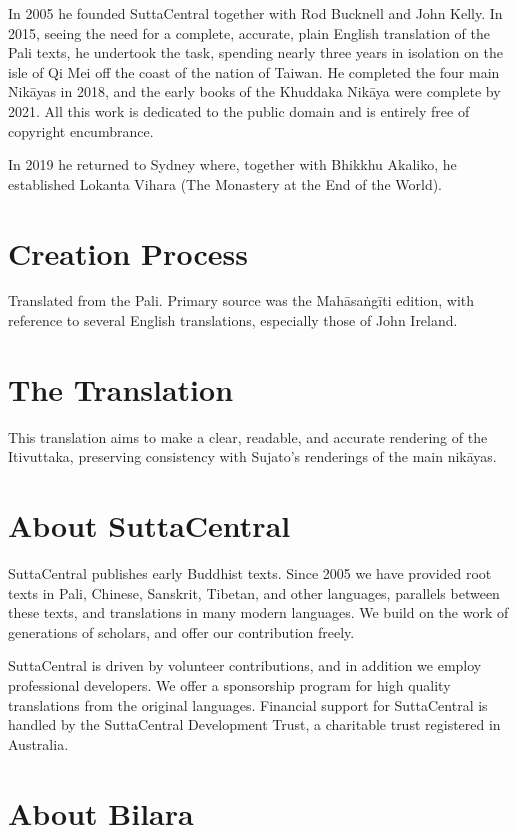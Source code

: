\documentclass[12pt,openany]{book}%
\begin{document}
In 2005 he founded SuttaCentral together with Rod Bucknell and John Kelly. In 2015, seeing the need for a complete, accurate, plain English translation of the Pali texts, he undertook the task, spending nearly three years in isolation on the isle of Qi Mei off the coast of the nation of Taiwan. He completed the four main \textsanskrit{Nikāyas} in 2018, and the early books of the Khuddaka \textsanskrit{Nikāya} were complete by 2021. All this work is dedicated to the public domain and is entirely free of copyright encumbrance. 

In 2019 he returned to Sydney where, together with Bhikkhu Akaliko, he established Lokanta Vihara (The Monastery at the End of the World). 

\section*{Creation Process}

Translated from the Pali. Primary source was the \textsanskrit{Mahāsaṅgīti} edition, with reference to several English translations, especially those of John Ireland.

\section*{The Translation}

This translation aims to make a clear, readable, and accurate rendering of the Itivuttaka, preserving consistency with Sujato’s renderings of the main \textsanskrit{nikāyas}. 

\section*{About SuttaCentral}

SuttaCentral publishes early Buddhist texts. Since 2005 we have provided root texts in Pali, Chinese, Sanskrit, Tibetan, and other languages, parallels between these texts, and translations in many modern languages. We build on the work of generations of scholars, and offer our contribution freely.

SuttaCentral is driven by volunteer contributions, and in addition we employ professional developers. We offer a sponsorship program for high quality translations from the original languages. Financial support for SuttaCentral is handled by the SuttaCentral Development Trust, a charitable trust registered in Australia.

\section*{About Bilara}
\end{document}
